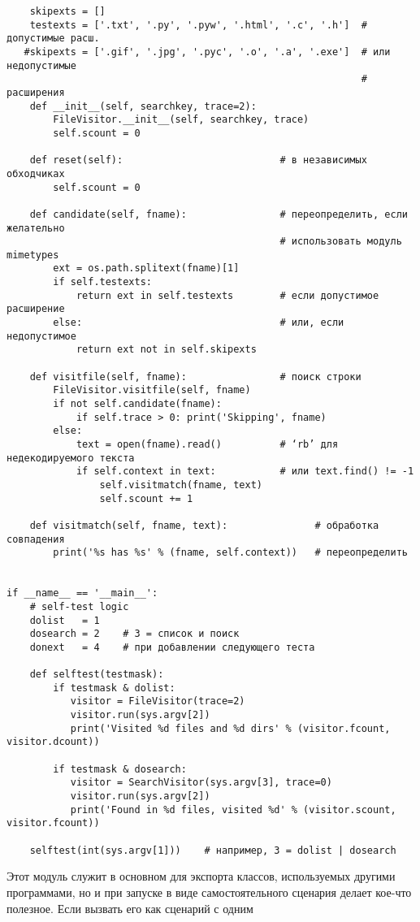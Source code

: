 \documentclass[12pt]{article}
\begin{document}
\begin{verbatim}
    skipexts = []
    testexts = ['.txt', '.py', '.pyw', '.html', '.c', '.h']  # допустимые расш.
   #skipexts = ['.gif', '.jpg', '.pyc', '.o', '.a', '.exe']  # или недопустимые
															 # расширения
    def __init__(self, searchkey, trace=2):
        FileVisitor.__init__(self, searchkey, trace)
        self.scount = 0

    def reset(self):                           # в независимых обходчиках
        self.scount = 0

    def candidate(self, fname):                # переопределить, если желательно 
    										   # использовать модуль mimetypes
        ext = os.path.splitext(fname)[1]
        if self.testexts:
            return ext in self.testexts        # если допустимое расширение
        else:                                  # или, если недопустимое
            return ext not in self.skipexts
         
    def visitfile(self, fname):                # поиск строки
        FileVisitor.visitfile(self, fname)
        if not self.candidate(fname):
            if self.trace > 0: print('Skipping', fname)
        else:
            text = open(fname).read()          # ‘rb’ для недекодируемого текста
            if self.context in text:           # или text.find() != -1
                self.visitmatch(fname, text)
                self.scount += 1

    def visitmatch(self, fname, text):               # обработка совпадения
        print('%s has %s' % (fname, self.context))   # переопределить


if __name__ == '__main__':
    # self-test logic
    dolist   = 1
    dosearch = 2    # 3 = список и поиск
    donext   = 4    # при добавлении следующего теста

    def selftest(testmask):
        if testmask & dolist:
           visitor = FileVisitor(trace=2)
           visitor.run(sys.argv[2])
           print('Visited %d files and %d dirs' % (visitor.fcount, visitor.dcount))

        if testmask & dosearch:
           visitor = SearchVisitor(sys.argv[3], trace=0)
           visitor.run(sys.argv[2])
           print('Found in %d files, visited %d' % (visitor.scount, visitor.fcount))

    selftest(int(sys.argv[1]))    # например, 3 = dolist | dosearch
\end{verbatim}
Этот модуль служит в основном для экспорта классов, используемых
другими программами, но и при запуске в виде самостоятельного сценария делает кое-что полезное. Если вызвать его как сценарий с одним
\end{document}
